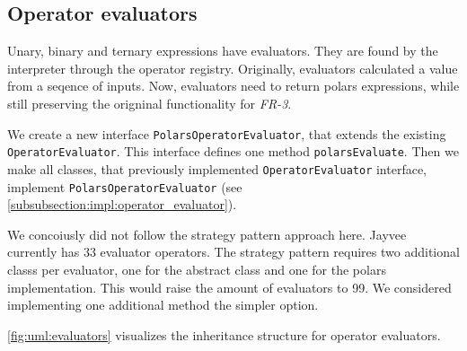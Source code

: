\subsection{Operator evaluators}
Unary, binary and ternary expressions have evaluators.
They are found by the interpreter through the operator registry.
Originally, evaluators calculated a value from a seqence of inputs.
Now, evaluators need to return polars expressions, while still preserving the origninal functionality for \emph{FR-3}.

We create a new interface \Verb|PolarsOperatorEvaluator|, that extends the existing \Verb|OperatorEvaluator|.
This interface defines one method \Verb|polarsEvaluate|.
Then we make all classes, that previously implemented \Verb|OperatorEvaluator| interface, implement \Verb|PolarsOperatorEvaluator| (see \ref{subsubsection:impl:operator_evaluator}).

We concoiusly did not follow the strategy pattern approach here.
Jayvee currently has 33 evaluator operators.
The strategy pattern requires two additional classs per evaluator, one for the abstract class and one for the polars implementation.
This would raise the amount of evaluators to 99.
We considered implementing one additional method the simpler option.

\ref{fig:uml:evaluators} visualizes the inheritance structure for operator evaluators.

